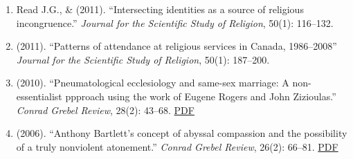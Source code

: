 \begin{enumerate}
\item Read J.G., \& \Eagle \hspace{.01em} (2011). ``Intersecting identities as a source of religious incongruence.''  \emph{Journal for the Scientific Study of Religion}, 50(1): 116--132. 

\item \Eagle \hspace{.01em} (2011). ``Patterns of attendance at religious services in Canada, 1986--2008'' \emph{Journal for the Scientific Study of Religion}, 50(1): 187--200. 

\item \Eagle \hspace{.01em} (2010). ``Pneumatological ecclesiology and same-sex marriage: A non-essentialist ppproach using the work of Eugene Rogers and John Zizioulas.'' \emph{Conrad Grebel Review}, 28(2): 43--68. \href{https://www.davideagle.org/publication/eagle-pneumatological-ecclesiology-samesex-2010/eagle-pneumatological-ecclesiology-samesex-2010.pdf}{PDF}

\item \Eagle\hspace{.01em} (2006). ``Anthony Bartlett's concept of abyssal compassion and the possibility of a truly nonviolent atonement.'' \emph{Conrad Grebel Review}, 26(2): 66--81. \href{https://www.davideagle.org/publication/eagle-anthony-bartlett-concept-2006/eagle-anthony-bartlett-concept-2006.pdf}{PDF}

\end{enumerate}


